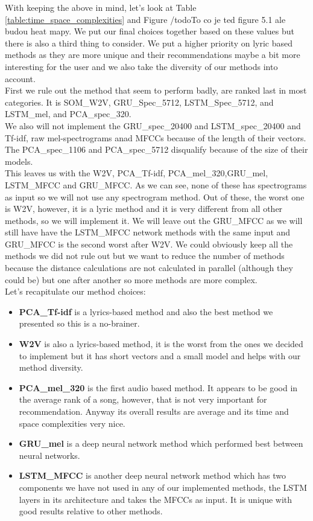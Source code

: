 With keeping the above in mind, let's look at Table \ref{table:time_space_complexities} and Figure /todo{To co je ted figure 5.1 ale budou heat mapy}. We put our final choices together based on these values but there is also a third thing to consider. We put a higher priority on lyric based methods as they are more unique and their recommendations maybe a bit more interesting for the user and we also take the diversity of our methods into account. \\
First we rule out the method that seem to perform badly, are ranked last in most categories. It is SOM\_W2V, GRU\_Spec\_5712, LSTM\_Spec\_5712, and LSTM\_mel, and PCA\_spec\_320. \\
We also will not implement the GRU\_spec\_20400 and LSTM\_spec\_20400 and Tf-idf, raw mel-spectrograms anad MFCCs because of the length of their vectors. The PCA\_spec\_1106 and PCA\_spec\_5712 disqualify because of the size of their models. \\
This leaves us with the W2V, PCA\_Tf-idf, PCA\_mel\_320,GRU\_mel, LSTM\_MFCC and GRU\_MFCC. As we can see, none of these has spectrograms as input so we will not use any spectrogram method. Out of these, the worst one is W2V, however, it is a lyric method and it is very different from all other methods, so we will implement it. We will leave out the GRU\_MFCC as we will still have have the LSTM\_MFCC network methods with the same input and GRU\_MFCC is the second worst after W2V. We could obviously keep all the methods we did not rule out but we want to reduce the number of methods because the distance calculations are not calculated in parallel (although they could be) but one after another so more methods are more complex. \\
Let's recapitulate our method choices:
\begin{itemize}
    \item \textbf{PCA\_Tf-idf} is a lyrics-based method and also the best method we presented so this is a no-brainer.
    \item \textbf{W2V} is also a lyrics-based method, it is the worst from the ones we decided to implement but it has short vectors and a small model and helps with our method diversity.
    \item \textbf{PCA\_mel\_320} is the first audio based method. It appears to be good in the average rank of a song, however, that is not very important for recommendation. Anyway its overall results are average and its time and space complexities very nice.
    \item \textbf{GRU\_mel} is a deep neural network method which performed best between neural networks.
    \item \textbf{LSTM\_MFCC} is another deep neural network method which has two components we have not used in any of our implemented methods, the LSTM layers in its architecture and takes the MFCCs as input. It is unique with good results relative to other methods. 
\end{itemize}

